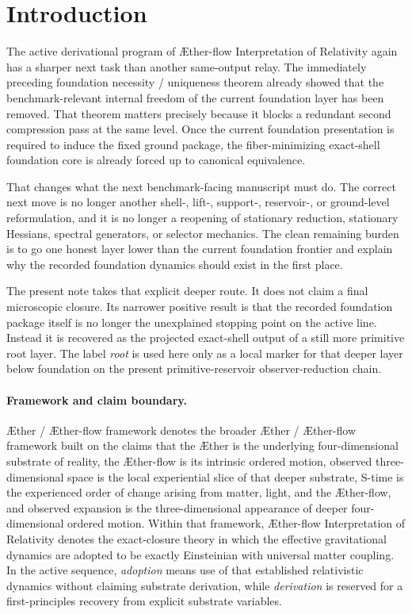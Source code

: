 \documentclass[11pt]{article}
\newcommand{\Aether}{\AE{}ther}
\newcommand{\Aflow}{\AE{}ther-flow}
\newcommand{\TheoryName}{\Aflow{} Interpretation of Relativity}
\newcommand{\TheoryProgram}{\Aether{} / \Aflow{} framework}
\begin{document}
\section{Introduction}

The active derivational program of \TheoryName{} again has a sharper next task than another same-output relay. The immediately preceding foundation necessity / uniqueness theorem already showed that the benchmark-relevant internal freedom of the current foundation layer has been removed. That theorem matters precisely because it blocks a redundant second compression pass at the same level. Once the current foundation presentation is required to induce the fixed ground package, the fiber-minimizing exact-shell foundation core is already forced up to canonical equivalence.

That changes what the next benchmark-facing manuscript must do. The correct next move is no longer another shell-, lift-, support-, reservoir-, or ground-level reformulation, and it is no longer a reopening of stationary reduction, stationary Hessians, spectral generators, or selector mechanics. The clean remaining burden is to go one honest layer lower than the current foundation frontier and explain why the recorded foundation dynamics should exist in the first place.

The present note takes that explicit deeper route. It does not claim a final microscopic closure. Its narrower positive result is that the recorded foundation package itself is no longer the unexplained stopping point on the active line. Instead it is recovered as the projected exact-shell output of a still more primitive root layer. The label \emph{root} is used here only as a local marker for that deeper layer below foundation on the present primitive-reservoir observer-reduction chain.

\paragraph{Framework and claim boundary.}
\TheoryProgram{} denotes the broader \Aether{} / \Aflow{} framework built on the claims that the \Aether{} is the underlying four-dimensional substrate of reality, the \Aflow{} is its intrinsic ordered motion, observed three-dimensional space is the local experiential slice of that deeper substrate, S-time is the experienced order of change arising from matter, light, and the \Aflow{}, and observed expansion is the three-dimensional appearance of deeper four-dimensional ordered motion. Within that framework, \TheoryName{} denotes the exact-closure theory in which the effective gravitational dynamics are adopted to be exactly Einsteinian with universal matter coupling. In the active sequence, \emph{adoption} means use of that established relativistic dynamics without claiming substrate derivation, while \emph{derivation} is reserved for a first-principles recovery from explicit substrate variables.
\end{document}
